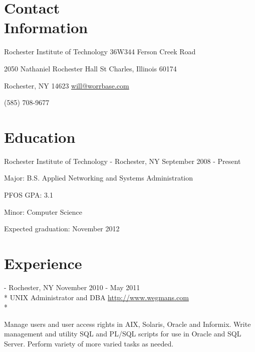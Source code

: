 \documentclass[letter,margin,line]{resume}
\newcommand{\rurl}[1]{\hfill {\footnotesize \url{#1}}}
\newcommand{\rdate}[1]{\hfill {\small #1}}
\renewcommand{\employer}[5]{\item[#1] - #2 \rdate{#3} \\* #4 \rurl{#5} \\*}
\begin{document}
\begin{resume}
\section{\mysidestyle Contact \\ Information} \vspace{2mm}
	\begin{asparablank}
		\item Rochester Institute of Technology \hfill 36W344 Ferson Creek Road
		\item 2050 Nathaniel Rochester Hall \hfill St Charles, Illinois 60174
		\item Rochester, NY 14623 \hfill
		\href{mailto:will@worrbase.com}{will@worrbase.com}
		\item (585) 708-9677 \hfill
	\end{asparablank}

\section{\mysidestyle Education}
	\begin{compactdesc}
		\item[Rochester Institute of Technology] - Rochester, NY \rdate{September 2008 - Present}
		\begin{compactitem} { \small
			\item Major: B.S. Applied Networking and Systems Administration
			\item PFOS GPA: 3.1
			\item Minor: Computer Science
			\item Expected graduation: November 2012
		} \end{compactitem}
	\end{compactdesc}

\section{\mysidestyle Experience}
	\begin{asparadesc}
        \employer{Wegmans Food Markets}{Rochester, NY}{November 2010 - May 2011}{UNIX Administrator and DBA}{http://www.wegmans.com}

        \small
        Manage users and user access rights in AIX, Solaris, Oracle and
        Informix. Write management and utility SQL and PL/SQL scripts for use in Oracle and
        SQL Server.  Perform variety of more varied tasks as needed.
		\normalsize
		\\
		

\end{asparadesc}
\end{resume}
\end{document}
